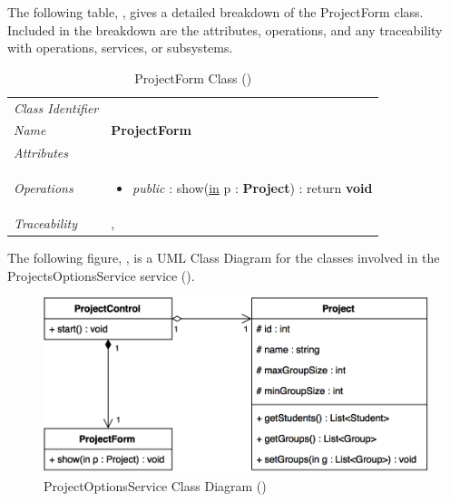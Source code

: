 \documentclass[12pt,letterpaper]{article}
\begin{document}
The following table, , gives a detailed breakdown of the ProjectForm class. Included in the breakdown are the attributes, operations, and any traceability with operations, services, or subsystems.

\begin{table}[H]
    \caption{ProjectForm Class ()} 
	\begin{tabu} to 
		\toprule
		Class Identifier &  \\
		Name & {\bf ProjectForm} \\
		Attributes & \\

		Operations &
		\begin{minipage}[t]{\linewidth}
			\begin{itemize}
			    \item {\it public} : show(\underline{in} p : {\bf Project}) : return {\bf void}
	        \end{itemize}
	    \end{minipage} \\
	    	Traceability & , \\
		\toprule
	\end{tabu}
\end{table}

\newpage{}
The following figure, , is a UML Class Diagram for the classes involved in the ProjectsOptionsService service ().

\begin{figure}[H]
	\centering{}
	\includegraphics[scale=0.35]{imgs/d3/interfaces/project-options.png}
	\caption{ProjectOptionsService Class Diagram ()}
\end{figure}
\end{document}
